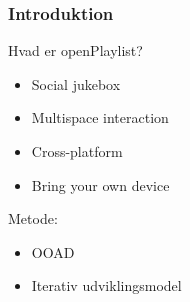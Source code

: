 \begin{frame}
	\frametitle{Introduktion}
		Hvad er openPlaylist?
	\begin{itemize}
		\item Social jukebox
		\item Multispace interaction
		\item Cross-platform
		\item Bring your own device
	\end{itemize}
	Metode:
	\begin{itemize}
		\item OOAD
		\item Iterativ udviklingsmodel
	\end{itemize}
\end{frame}
